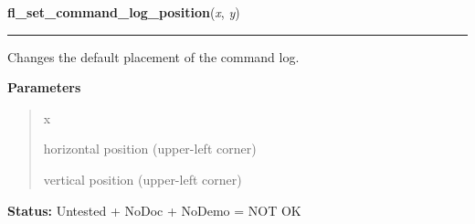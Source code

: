     \label{xformslib:library:fl_set_command_log_position}

    \vspace{0.5ex}

\hspace{.8\funcindent}\begin{boxedminipage}{\funcwidth}

    \raggedright \textbf{fl\_set\_command\_log\_position}(\textit{x}, \textit{y})

    \vspace{-1.5ex}

    \rule{\textwidth}{0.5\fboxrule}
\setlength{\parskip}{2ex}
    Changes the default placement of the command log.

\setlength{\parskip}{1ex}
      \textbf{Parameters}
      \vspace{-1ex}

      \begin{quote}
        \begin{Ventry}{x}

          \item[x]

          horizontal position (upper-left corner)

          \item[y]

          vertical position (upper-left corner)

        \end{Ventry}

      \end{quote}

\textbf{Status:} Untested + NoDoc + NoDemo = NOT OK



    \end{boxedminipage}

    \label{xformslib:library:fl_get_command_log_fdstruct}

    \vspace{0.5ex}

